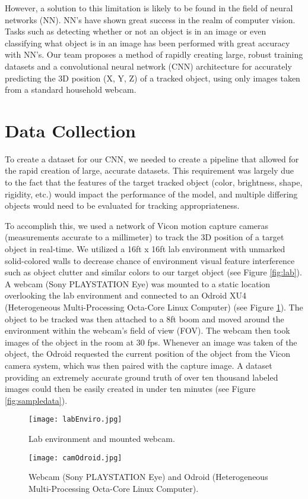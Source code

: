 \documentclass{article}
\begin{document}
However, a solution to this limitation is likely to be found in the field of neural networks (NN). NN's have shown great success in the realm of computer vision. Tasks such as detecting whether or not an object is in an image or even classifying what object is in an image has been performed with great accuracy with NN’s. Our team proposes a method of rapidly creating large, robust training datasets and a convolutional neural network (CNN) architecture for accurately predicting the 3D position (X, Y, Z) of a tracked object,  using only images taken from a standard household webcam.

\section{Data Collection}
\label{data_collect}

To create a dataset for our CNN, we needed to create a pipeline that allowed for the rapid creation of large, accurate datasets. This requirement was largely due to the fact that the features of the target tracked object (color, brightness, shape, rigidity, etc.) would impact the performance of the model, and multiple differing objects would need to be evaluated for tracking appropriateness.

To accomplish this, we used a network of Vicon motion capture cameras (measurements accurate to a millimeter) to track the 3D position of a target object in real-time. We utilized a 16ft x 16ft lab environment with unmarked solid-colored walls to decrease chance of environment visual feature interference such as object clutter and similar colors to our target object (see Figure \ref{fig:lab}). A webcam (Sony PLAYSTATION Eye) was mounted to a static location overlooking the lab environment and connected to an Odroid XU4 (Heterogeneous Multi-Processing Octa-Core Linux Computer) (see Figure \ref{fig:webcam}). The object to be tracked was then attached to a 8ft boom and moved around the environment within the webcam's field of view (FOV). The webcam then took images of the object in the room at 30 fps. Whenever an image was taken of the object, the Odroid requested the current position of the object from the Vicon camera system, which was then paired with the capture image. A dataset providing an extremely accurate ground truth of over ten thousand labeled images could then be easily created in under ten minutes (see Figure \ref{fig:sampledata}).

\begin{figure}[!tbp]
  \centering
  \begin{minipage}[b]{0.48\textwidth}
    \texttt{[image: labEnviro.jpg]}
    \caption{Lab environment and mounted webcam.}
    \label{fig:lab}
   \end{minipage}
   \hfill
  \begin{minipage}[b]{0.45\textwidth}   
    \texttt{[image: camOdroid.jpg]}
    \caption{Webcam (Sony PLAYSTATION Eye) and Odroid (Heterogeneous Multi-Processing Octa-Core Linux Computer).}
    \label{fig:webcam}
  \end{minipage}
\end{figure}
\end{document}
